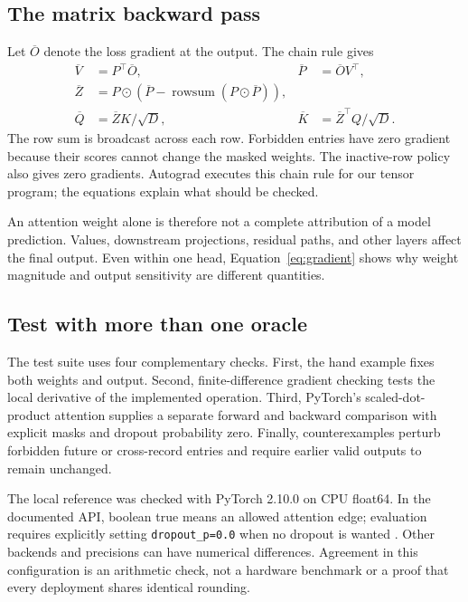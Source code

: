 
\subsection{The matrix backward pass}

Let $\overline O$ denote the loss gradient at the output. The chain rule gives
\begin{align}
\overline V&=P^\top\overline O,&
\overline P&=\overline O V^\top,\\
\overline Z&=P\odot
\left(\overline P-\operatorname{rowsum}(P\odot\overline P)\right),\\
\overline Q&=\overline ZK/\sqrt D,&
\overline K&=\overline Z^\top Q/\sqrt D.
\label{eq:backward}
\end{align}
The row sum is broadcast across each row. Forbidden entries have zero gradient because their scores cannot change the masked weights. The inactive-row policy also gives zero gradients. Autograd executes this chain rule for our tensor program; the equations explain what should be checked.

An attention weight alone is therefore not a complete attribution of a model prediction. Values, downstream projections, residual paths, and other layers affect the final output. Even within one head, Equation~\ref{eq:gradient} shows why weight magnitude and output sensitivity are different quantities.

\subsection{Test with more than one oracle}

The test suite uses four complementary checks. First, the hand example fixes both weights and output. Second, finite-difference gradient checking tests the local derivative of the implemented operation. Third, PyTorch's scaled-dot-product attention supplies a separate forward and backward comparison with explicit masks and dropout probability zero. Finally, counterexamples perturb forbidden future or cross-record entries and require earlier valid outputs to remain unchanged.

The local reference was checked with PyTorch 2.10.0 on CPU float64. In the documented API, boolean true means an allowed attention edge; evaluation requires explicitly setting \texttt{dropout\_p=0.0} when no dropout is wanted \cite{sdpa}. Other backends and precisions can have numerical differences. Agreement in this configuration is an arithmetic check, not a hardware benchmark or a proof that every deployment shares identical rounding.

